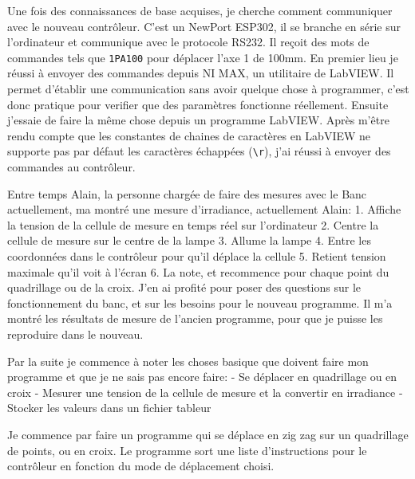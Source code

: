 \documentclass[a4paper, 12pt]{article}
\begin{document}
  
Une fois des connaissances de base acquises, je cherche comment communiquer avec le nouveau contrôleur.  
C'est un NewPort ESP302, il se branche en série sur l'ordinateur et communique avec le protocole RS232.  
Il reçoit des mots de commandes tels que \verb|1PA100| pour déplacer l'axe 1 de 100mm.  
En premier lieu je réussi à envoyer des commandes depuis NI MAX, un utilitaire de LabVIEW.  
Il permet d'établir une communication sans avoir quelque chose à programmer, c'est donc pratique pour verifier que des paramètres fonctionne réellement.  
Ensuite j'essaie de faire la même chose depuis un programme LabVIEW.  
Après m'être rendu compte que les constantes de chaines de caractères en LabVIEW ne supporte pas par défaut les caractères échappées (\texttt{\textbackslash r}), j'ai réussi à envoyer des commandes au contrôleur.  
  
Entre temps Alain, la personne chargée de faire des mesures avec le Banc actuellement, ma montré une mesure d'irradiance, actuellement Alain:  
1. Affiche la tension de la cellule de mesure en temps réel sur l'ordinateur  
2. Centre la cellule de mesure sur le centre de la lampe  
3. Allume la lampe  
4. Entre les coordonnées dans le contrôleur pour qu'il déplace la cellule  
5. Retient tension maximale qu'il voit à l'écran  
6. La note, et recommence pour chaque point du quadrillage ou de la croix.  
J'en ai profité pour poser des questions sur le fonctionnement du banc, et sur les besoins pour le nouveau programme.  
Il m'a montré les résultats de mesure de l'ancien programme, pour que je puisse les reproduire dans le nouveau.  
  
Par la suite je commence à noter les choses basique que doivent faire mon programme et que je ne sais pas encore faire:  
- Se déplacer en quadrillage ou en croix  
- Mesurer une tension de la cellule de mesure et la convertir en irradiance  
- Stocker les valeurs dans un fichier tableur  
  
Je commence par faire un programme qui se déplace en zig zag sur un quadrillage de points, ou en croix.  
Le programme sort une liste d'instructions pour le contrôleur en fonction du mode de déplacement choisi.  
  
\end{document}
